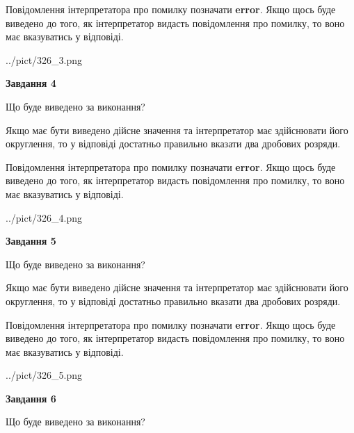 \documentclass[12pt, ukrainian]{article}
\begin{document}
{\begin {Large}
Повідомлення інтерпретатора про помилку позначати \textbf{error}.
Якщо щось буде виведено до того, як інтерпретатор видасть повідомлення про помилку, 
то воно має вказуватись у відповіді. \par

\begin{center}
	{../pict/326_3.png}
\end{center}
\newpage

{\begin {center}\textbf{Завдання 4}\end {center}}\par
Що буде виведено за виконання? \par

Якщо має бути виведено дійсне значення та інтерпретатор має здійснювати його округлення, 
то у відповіді достатньо правильно вказати два дробових розряди.

Повідомлення інтерпретатора про помилку позначати \textbf{error}.
Якщо щось буде виведено до того, як інтерпретатор видасть повідомлення про помилку, 
то воно має вказуватись у відповіді. \par

\begin{center}
	{../pict/326_4.png}
\end{center}
\newpage

{\begin {center}\textbf{Завдання 5}\end {center}}\par
Що буде виведено за виконання? \par

Якщо має бути виведено дійсне значення та інтерпретатор має здійснювати його округлення, 
то у відповіді достатньо правильно вказати два дробових розряди.

Повідомлення інтерпретатора про помилку позначати \textbf{error}.
Якщо щось буде виведено до того, як інтерпретатор видасть повідомлення про помилку, 
то воно має вказуватись у відповіді. \par

\begin{center}
	{../pict/326_5.png}
\end{center}
\newpage

{\begin {center}\textbf{Завдання 6}\end {center}}\par
Що буде виведено за виконання? \par


\end{Large}}
\end{document}
